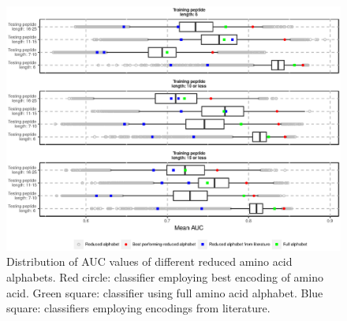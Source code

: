 \documentclass{bioinfo}
\begin{document}
\begin{figure}[!tpb]
\centerline{\includegraphics{figures/AUC_boxplot.eps}}
\caption{Distribution of AUC values of different reduced amino acid alphabets. Red circle: classifier employing best encoding of amino acid. Green square: classifier using full amino acid alphabet. Blue square: classifiers employing encodings from literature.}\label{fig:AUC_boxplot}
\end{figure}
\end{document}
